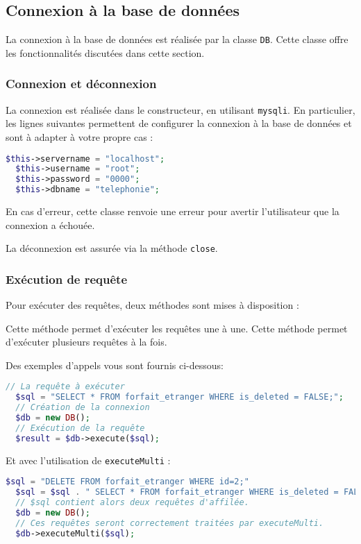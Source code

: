 \subsection{Connexion à la base de données}
La connexion à la base de données est réalisée par la classe \texttt{DB}. Cette classe offre les fonctionnalités discutées dans cette section.

\subsubsection{Connexion et déconnexion}
La connexion est réalisée dans le constructeur, en utilisant \texttt{mysqli}. En particulier, les lignes suivantes permettent de configurer la connexion à la base de données et sont à adapter à votre propre cas :

\begin{lstlisting}[language=php]
  $this->servername = "localhost";
  $this->username = "root";
  $this->password = "0000";
  $this->dbname = "telephonie";
\end{lstlisting}

En cas d'erreur, cette classe renvoie une erreur pour avertir l'utilisateur que la connexion a échouée.

La déconnexion est assurée via la méthode \texttt{close}.

\subsubsection{Exécution de requête}
Pour exécuter des requêtes, deux méthodes sont mises à disposition :
\begin{itemize}
  Cette méthode permet d'exécuter les requêtes une à une.
  Cette méthode permet d'exécuter plusieurs requêtes à la fois.
\end{itemize}
Des exemples d'appels vous sont fournis ci-dessous:

\begin{lstlisting}[language=php]
  // La requête à exécuter
  $sql = "SELECT * FROM forfait_etranger WHERE is_deleted = FALSE;";
  // Création de la connexion
  $db = new DB();
  // Exécution de la requête
  $result = $db->execute($sql);
\end{lstlisting}

Et avec l'utilisation de \texttt{executeMulti} :
\begin{lstlisting}[language=php]
  $sql = "DELETE FROM forfait_etranger WHERE id=2;"
  $sql = $sql . " SELECT * FROM forfait_etranger WHERE is_deleted = FALSE;";
  // $sql contient alors deux requêtes d'affilée.
  $db = new DB();
  // Ces requêtes seront correctement traitées par executeMulti.
  $db->executeMulti($sql);
\end{lstlisting}

